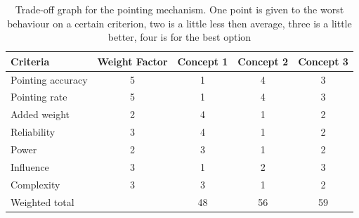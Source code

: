 \begin{table} [h]
\centering
\begin{tabular}{p{3cm} | c | c c c}
\textbf{Criteria} & \textbf{Weight Factor} & \textbf{Concept 1} & \textbf{Concept 2} & \textbf{Concept 3} \\ \hline \hline
Pointing accuracy & 5 & 1 & 4 & 3 \\
Pointing rate & 5 & 1 & 4 & 3 \\
Added weight & 2 & 4 & 1 & 2 \\
Reliability & 3 & 4 & 1 & 2 \\
Power & 2 & 3 & 1 & 2 \\
Influence & 3 & 1 & 2 & 3\\
Complexity & 3 & 3 & 1 & 2 \\ \hline
Weighted total & & 48 & 56 & 59
\end{tabular} 
\caption[Trade-off pointing mechanism]{Trade-off graph for the pointing mechanism. One point is given to the worst behaviour on a certain criterion, two is a little less then average, three is a little better, four is for the best option}
\label{tab:pointingtradeoff}
\end{table}

